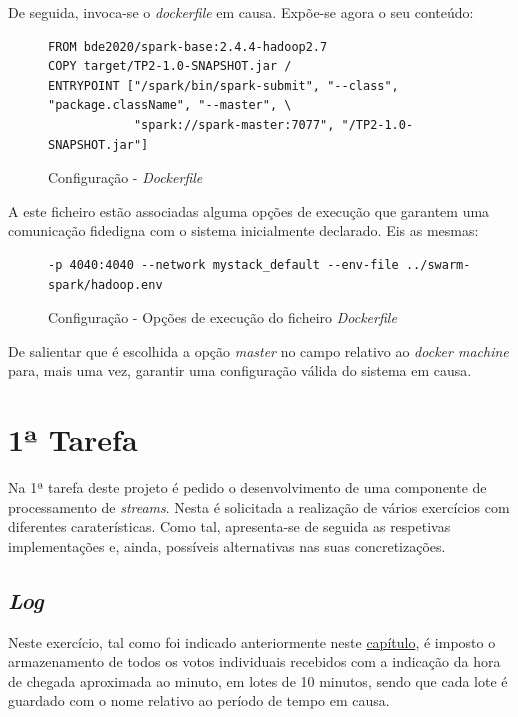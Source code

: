 \documentclass[a4paper]{report}
\begin{document}
        De seguida, invoca-se o \textit{dockerfile} em causa. Expõe-se agora o seu conteúdo:
        \begin{figure}[H]
            \centering
            \begin{verbatim}
FROM bde2020/spark-base:2.4.4-hadoop2.7
COPY target/TP2-1.0-SNAPSHOT.jar /
ENTRYPOINT ["/spark/bin/spark-submit", "--class", "package.className", "--master", \
            "spark://spark-master:7077", "/TP2-1.0-SNAPSHOT.jar"]
            \end{verbatim}
            \vspace{-5mm}
            \caption{Configuração - \textit{Dockerfile}}
            \label{fig:15}
        \end{figure}

        A este ficheiro estão associadas alguma opções de execução que garantem uma comunicação fidedigna com o sistema inicialmente declarado. Eis as mesmas:
        \begin{figure}[H]
            \centering
            \begin{verbatim}
-p 4040:4040 --network mystack_default --env-file ../swarm-spark/hadoop.env
            \end{verbatim}
            \vspace{-5mm}
            \caption{Configuração - Opções de execução do ficheiro \textit{Dockerfile}}
            \label{fig:16}
        \end{figure}

        De salientar que é escolhida a opção \textsl{master} no campo relativo ao \textit{docker machine} para, mais uma vez, garantir uma configuração válida do sistema em causa.

    \section{1ª Tarefa} \label{sec:Task1}
        Na 1ª tarefa deste projeto é pedido o desenvolvimento de uma componente de processamento de \textit{streams}. Nesta é solicitada a realização de vários exercícios com diferentes caraterísticas. Como tal, apresenta-se de seguida as respetivas implementações e, ainda, possíveis alternativas nas suas concretizações.

        \subsection{\textit{Log}} \label{subsec:Task1-Log}
        Neste exercício, tal como foi indicado anteriormente neste \hyperref[ch:Implementation]{capítulo}, é imposto o armazenamento de todos os votos individuais recebidos com a indicação da hora de chegada aproximada ao minuto, em lotes de 10 minutos, sendo que cada lote é guardado com o nome relativo ao período de tempo em causa.
\end{document}
